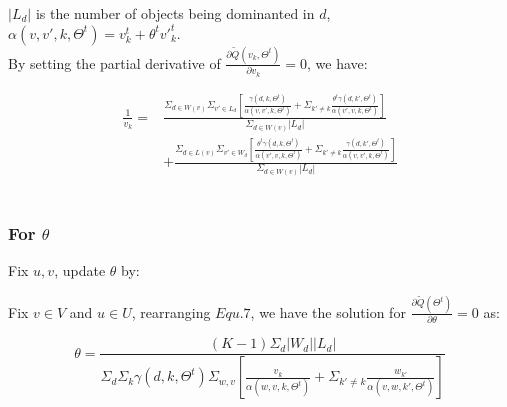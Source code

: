 \documentclass{article}
\begin{document}
 $|L_d|$ is the number of objects being dominanted in $d$,
 \\ $\alpha(v,v',k,\Theta^t)=v_k^t + \theta^t {v'}_k^t$.
 \\
By setting the partial derivative of $\frac{\partial \tilde{Q}(v_k,\Theta^t)}{\partial v_k}=0$, we have:



\begin{equation}
\begin{aligned}
\frac{1}{v_k}= &\frac{\Sigma_{d\in W(v)}\Sigma_{v'\in L_d} [\frac{\gamma(d,k,\Theta^t)}{ \alpha(v,v',k,\Theta^t)} +\Sigma_{k'\neq k}\frac{\theta^t\gamma(d,k',\Theta^t)}{\alpha(v',v,k,\Theta^t)}]}{\Sigma_{d\in W(v)}|L_d|}\\\nonumber
 & + \frac{\Sigma_{d\in L(v)}\Sigma_{v'\in W_d} [\frac{\theta^t \gamma(d,k,\Theta^t)}{\alpha(v',v,k,\Theta^t)}+\Sigma_{k'\neq k} \frac{\gamma(d,k',\Theta^t)}{\alpha(v,v',k,\Theta^t)}] }{\Sigma_{d\in W(v)}|L_d|}
\end{aligned}
\end{equation}\\

\subsubsection{For $\theta$}
Fix $u,v$, update $\theta$ by:

  Fix $v \in V$ and $u \in U$, rearranging $Equ.7$, we have the solution for $\frac{\partial \tilde{Q}(\Theta^t)}{\partial \theta}=0$ as:

 \begin{equation}
\theta = \frac{(K-1)\Sigma_d |W_d| |L_d|}{\Sigma_d \Sigma_k \gamma(d,k,\Theta^t) \Sigma_{w,v} [\frac{v_k}{\alpha(w,v,k,\Theta^t)}+\Sigma_{k'\neq k} \frac{w_{k'}}{\alpha(v,w,k',\Theta^t)}]}
 \end{equation}
\end{document}
